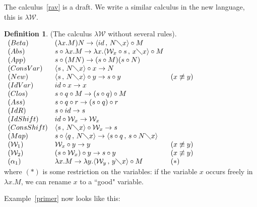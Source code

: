 \documentclass[11pt]{amsart}
\theoremstyle{plain}
\theoremstyle{definition}
\newtheorem{definition}[theorem]{Definition}
\theoremstyle{remark}
\numberwithin{equation}{section}
\newcommand{\ci}{\circ}
\newcommand{\mi}{\,,\,}
\newcommand{\is}{\diagdown}
\renewcommand{\pi}{\mathcal{W}}
\begin{document}
The calculus~\ref{rav} is a draft. We write a similar calculus in
the new language, this is $\lambda\pi$.
\begin{definition}(The calculus $\lambda\pi$ without several rules).\\
 $
\begin{array}{lll}
(Beta) & (\lambda x.M)N\rightarrow \langle id\mi N\is x\rangle\ci M &\\
(Abs) & s\ci \lambda x.M\rightarrow\lambda x.\langle \pi_{x}\ci
s\mi x\is
x\rangle\ci M &\\
(App) & s\ci (MN)\rightarrow(s\ci  M)(s\ci  N) &\\
(ConsVar) & \langle s\mi N\is x\rangle\ci x\rightarrow N &\\
(New) & \langle s\mi N\is x\rangle\ci y\rightarrow  s\ci y & (x\not\equiv y)\\
(IdVar) &  id\ci x\rightarrow x &\\
(Clos) & s\ci q\ci M\rightarrow (s\ci q)\ci M &\\
(Ass) & s\ci q\ci  r\rightarrow (s\ci q)\ci r &\\
(IdR) & s\ci id\rightarrow s &\\
(IdShift) & id\ci \pi_{x}\rightarrow\pi_{x} &\\
(ConsShift) & \langle s\mi N\is x\rangle\ci \pi_{x}\rightarrow s &\\
(Map) & s\ci \langle q\mi N\is x\rangle\rightarrow\langle
s\ci q \mi s\ci N\is x\rangle &\\
(\pi_1) & \pi_{x}\ci y\rightarrow y & (x\not\equiv y)\\
(\pi_2) & (s\ci\pi_{x})\ci y\rightarrow s\ci y & (x \not\equiv
y)\\
(\alpha_1) & \lambda x.M\rightarrow\lambda y.\langle\pi_{y}\mi
y\is x\rangle\ci M & (*)
\end{array}$
\\
where $(*)$ is some restriction on the variables: if the variable
$x$ occurs freely in $\lambda x.M$, we can rename $x$ to a ``good"
variable.
\end{definition}
Example~\ref{primer} now looks like this:
\end{document}
